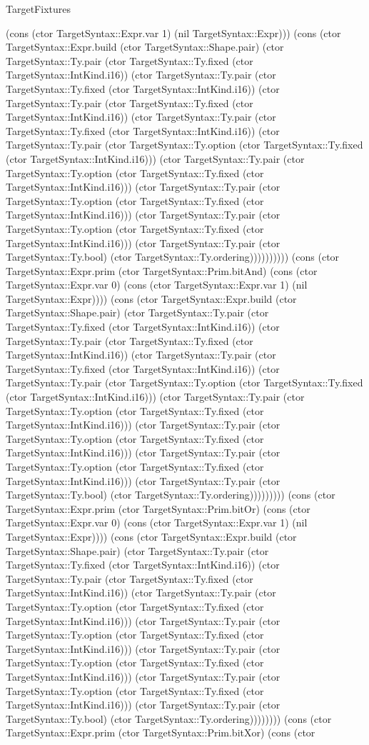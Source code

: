 \begin{lexlean}{TargetFixtures}
\begin{semanticmodule}
{(cons (ctor TargetSyntax::Expr.var 1) (nil TargetSyntax::Expr))) (cons (ctor TargetSyntax::Expr.build (ctor TargetSyntax::Shape.pair) (ctor TargetSyntax::Ty.pair (ctor TargetSyntax::Ty.fixed (ctor TargetSyntax::IntKind.i16)) (ctor TargetSyntax::Ty.pair (ctor TargetSyntax::Ty.fixed (ctor TargetSyntax::IntKind.i16)) (ctor TargetSyntax::Ty.pair (ctor TargetSyntax::Ty.fixed (ctor TargetSyntax::IntKind.i16)) (ctor TargetSyntax::Ty.pair (ctor TargetSyntax::Ty.fixed (ctor TargetSyntax::IntKind.i16)) (ctor TargetSyntax::Ty.pair (ctor TargetSyntax::Ty.option (ctor TargetSyntax::Ty.fixed (ctor TargetSyntax::IntKind.i16))) (ctor TargetSyntax::Ty.pair (ctor TargetSyntax::Ty.option (ctor TargetSyntax::Ty.fixed (ctor TargetSyntax::IntKind.i16))) (ctor TargetSyntax::Ty.pair (ctor TargetSyntax::Ty.option (ctor TargetSyntax::Ty.fixed (ctor TargetSyntax::IntKind.i16))) (ctor TargetSyntax::Ty.pair (ctor TargetSyntax::Ty.option (ctor TargetSyntax::Ty.fixed (ctor TargetSyntax::IntKind.i16))) (ctor TargetSyntax::Ty.pair (ctor TargetSyntax::Ty.bool) (ctor TargetSyntax::Ty.ordering)))))))))) (cons (ctor TargetSyntax::Expr.prim (ctor TargetSyntax::Prim.bitAnd) (cons (ctor TargetSyntax::Expr.var 0) (cons (ctor TargetSyntax::Expr.var 1) (nil TargetSyntax::Expr)))) (cons (ctor TargetSyntax::Expr.build (ctor TargetSyntax::Shape.pair) (ctor TargetSyntax::Ty.pair (ctor TargetSyntax::Ty.fixed (ctor TargetSyntax::IntKind.i16)) (ctor TargetSyntax::Ty.pair (ctor TargetSyntax::Ty.fixed (ctor TargetSyntax::IntKind.i16)) (ctor TargetSyntax::Ty.pair (ctor TargetSyntax::Ty.fixed (ctor TargetSyntax::IntKind.i16)) (ctor TargetSyntax::Ty.pair (ctor TargetSyntax::Ty.option (ctor TargetSyntax::Ty.fixed (ctor TargetSyntax::IntKind.i16))) (ctor TargetSyntax::Ty.pair (ctor TargetSyntax::Ty.option (ctor TargetSyntax::Ty.fixed (ctor TargetSyntax::IntKind.i16))) (ctor TargetSyntax::Ty.pair (ctor TargetSyntax::Ty.option (ctor TargetSyntax::Ty.fixed (ctor TargetSyntax::IntKind.i16))) (ctor TargetSyntax::Ty.pair (ctor TargetSyntax::Ty.option (ctor TargetSyntax::Ty.fixed (ctor TargetSyntax::IntKind.i16))) (ctor TargetSyntax::Ty.pair (ctor TargetSyntax::Ty.bool) (ctor TargetSyntax::Ty.ordering))))))))) (cons (ctor TargetSyntax::Expr.prim (ctor TargetSyntax::Prim.bitOr) (cons (ctor TargetSyntax::Expr.var 0) (cons (ctor TargetSyntax::Expr.var 1) (nil TargetSyntax::Expr)))) (cons (ctor TargetSyntax::Expr.build (ctor TargetSyntax::Shape.pair) (ctor TargetSyntax::Ty.pair (ctor TargetSyntax::Ty.fixed (ctor TargetSyntax::IntKind.i16)) (ctor TargetSyntax::Ty.pair (ctor TargetSyntax::Ty.fixed (ctor TargetSyntax::IntKind.i16)) (ctor TargetSyntax::Ty.pair (ctor TargetSyntax::Ty.option (ctor TargetSyntax::Ty.fixed (ctor TargetSyntax::IntKind.i16))) (ctor TargetSyntax::Ty.pair (ctor TargetSyntax::Ty.option (ctor TargetSyntax::Ty.fixed (ctor TargetSyntax::IntKind.i16))) (ctor TargetSyntax::Ty.pair (ctor TargetSyntax::Ty.option (ctor TargetSyntax::Ty.fixed (ctor TargetSyntax::IntKind.i16))) (ctor TargetSyntax::Ty.pair (ctor TargetSyntax::Ty.option (ctor TargetSyntax::Ty.fixed (ctor TargetSyntax::IntKind.i16))) (ctor TargetSyntax::Ty.pair (ctor TargetSyntax::Ty.bool) (ctor TargetSyntax::Ty.ordering)))))))) (cons (ctor TargetSyntax::Expr.prim (ctor TargetSyntax::Prim.bitXor) (cons (ctor }
\end{semanticmodule}
\end{lexlean}
